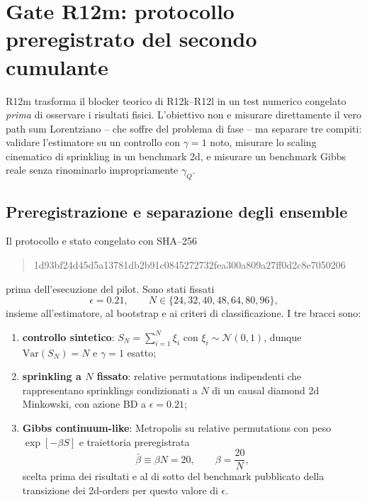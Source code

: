 \documentclass[11pt,a4paper]{article}
\begin{document}
\section{Gate R12m: protocollo preregistrato del secondo cumulante}

R12m trasforma il blocker teorico di R12k--R12l in un test numerico congelato \emph{prima} di osservare i risultati fisici. L'obiettivo non e misurare direttamente il vero path sum Lorentziano -- che soffre del problema di fase -- ma separare tre compiti: validare l'estimatore su un controllo con $\gamma=1$ noto, misurare lo scaling cinematico di sprinkling in un benchmark 2d, e misurare un benchmark Gibbs reale senza rinominarlo impropriamente $\gamma_Q$.

\subsection{Preregistrazione e separazione degli ensemble}

Il protocollo e stato congelato con SHA--256
\begin{quote}\ttfamily
1d93bf24d45d5a13781db2b91c0845272732fea300a809a27ff0d2c8e7050206
\end{quote}
prima dell'esecuzione del pilot. Sono stati fissati
\begin{equation}
\epsilon=0.21,
\qquad
N\in\{24,32,40,48,64,80,96\},
\end{equation}
insieme all'estimatore, al bootstrap e ai criteri di classificazione. I tre bracci sono:
\begin{enumerate}[label=(\roman*)]
\item \textbf{controllo sintetico}: $S_N=\sum_{i=1}^N\xi_i$ con $\xi_i\sim\mathcal N(0,1)$, dunque $\mathrm{Var}(S_N)=N$ e $\gamma=1$ esatto;
\item \textbf{sprinkling a $N$ fissato}: relative permutations indipendenti che rappresentano sprinklings condizionati a $N$ di un causal diamond 2d Minkowski, con azione BD a $\epsilon=0.21$;
\item \textbf{Gibbs continuum-like}: Metropolis su relative permutations con peso $\exp[-\beta S]$ e traiettoria preregistrata
\begin{equation}
\bar\beta\equiv\beta N=20,
\qquad
\beta=\frac{20}{N},
\end{equation}
scelta prima dei risultati e al di sotto del benchmark pubblicato della transizione dei 2d-orders per questo valore di $\epsilon$.
\end{enumerate}
\end{document}

